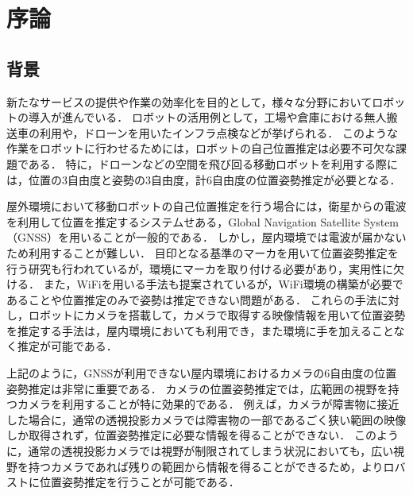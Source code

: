 \chapter{序論}
\thispagestyle{empty}
\label{Chap1}
\minitoc

\newpage

\section{背景}
\label{Demand}

新たなサービスの提供や作業の効率化を目的として，様々な分野においてロボットの導入が進んでいる．
ロボットの活用例として，工場や倉庫における無人搬送車の利用\mbox{\cite{ゾリーグ2014}}や，ドローンを用いたインフラ点検\mbox{\cite{Hada2017}}などが挙げられる．
このような作業をロボットに行わせるためには，ロボットの自己位置推定は必要不可欠な課題である．
特に，ドローンなどの空間を飛び回る移動ロボットを利用する際には，位置の3自由度と姿勢の3自由度，計6自由度の位置姿勢推定が必要となる．
\vspace{\baselineskip}

屋外環境において移動ロボットの自己位置推定を行う場合には，衛星からの電波を利用して位置を推定するシステムせある，Global Navigation Satellite System（GNSS）を用いることが一般的である\mbox{\cite{Ohno2004}}\mbox{\cite{Kim2007}}．
しかし，屋内環境では電波が届かないため利用することが難しい．
目印となる基準のマーカを用いて位置姿勢推定を行う研究\mbox{\cite{Olson2011}}も行われているが，環境にマーカを取り付ける必要があり，実用性に欠ける．
また，WiFiを用いる手法\mbox{\cite{Miyagusuku2016}}も提案されているが，WiFi環境の構築が必要であることや位置推定のみで姿勢は推定できない問題がある．
これらの手法に対し，ロボットにカメラを搭載して，カメラで取得する映像情報を用いて位置姿勢を推定する手法は，屋内環境においても利用でき，また環境に手を加えることなく推定が可能である．
\vspace{\baselineskip}

上記のように，GNSSが利用できない屋内環境におけるカメラの6自由度の位置姿勢推定は非常に重要である．
カメラの位置姿勢推定では，広範囲の視野を持つカメラを利用することが特に効果的である．
例えば，カメラが障害物に接近した場合に，通常の透視投影カメラでは障害物の一部であるごく狭い範囲の映像しか取得されず，位置姿勢推定に必要な情報を得ることができない．
このように，通常の透視投影カメラでは視野が制限されてしまう状況においても，広い視野を持つカメラであれば残りの範囲から情報を得ることができるため，よりロバストに位置姿勢推定を行うことが可能である．
\vspace{\baselineskip}

